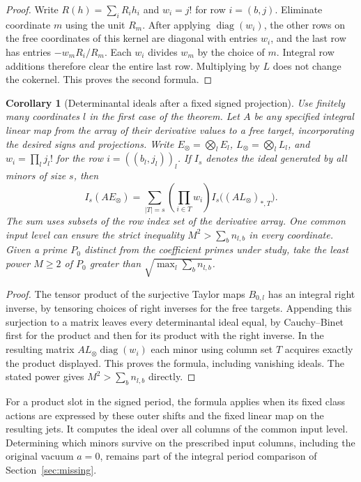 \documentclass[a4paper,11pt]{article}
\newtheorem{corollary}[proposition]{Corollary}
\theoremstyle{definition}
\theoremstyle{remark}
\numberwithin{equation}{section}
\begin{document}
\begin{proof}
Write \(R(h)=\sum_i R_i h_i\) and \(w_i=j!\) for row \(i=(b,j)\).
Eliminate coordinate \(m\) using the unit \(R_m\). After applying
\(\operatorname{diag}(w_i)\), the other rows on the free
coordinates of this kernel are diagonal with entries \(w_i\),
and the last row has entries \(-w_m R_i/R_m\). Each \(w_i\)
divides \(w_m\) by the choice of \(m\). Integral row additions
therefore clear the entire last row. Multiplying by \(L\) does
not change the cokernel. This proves the second formula.
\end{proof}

\begin{corollary}[Determinantal ideals after a fixed signed projection]\leavevmode
\label{cor:projectedminors485}
Use finitely many coordinates \(l\) in the first case of the
theorem. Let \(A\) be any specified integral linear map from the
array of their derivative values to a free target, incorporating
the desired signs and projections. Write \(E_\otimes=\bigotimes_lE_l\),
\(L_\otimes=\bigotimes_l L_l\), and
\(w_i=\prod_l j_l!\) for the row \(i=((b_l,j_l))_l\).
If \(I_s\) denotes the ideal generated by all minors of size \(s\),
then
\[
 I_s(AE_\otimes)
      =\sum_{|T|=s}
        \left(\prod_{i\in T}w_i\right)
                  I_s\bigl((A L_\otimes)_{*,T}\bigr).
\]
The sum uses subsets of the row index set of the derivative
array. One common input level can ensure the strict inequality
\(M^2>\sum_b n_{l,b}\) in every coordinate. Given a prime
\(P_0\) distinct from the coefficient primes under study, take
the least power \(M\ge2\) of \(P_0\) greater than
\(\sqrt{\max_l\sum_b n_{l,b}}\).
\end{corollary}
\begin{proof}
The tensor product of the surjective Taylor maps \(B_{0,l}\)
has an integral right inverse, by tensoring choices of right
inverses for the free targets. Appending this surjection to a
matrix leaves every determinantal ideal equal, by Cauchy--Binet
first for the product and then for its product with the right
inverse. In the resulting matrix \(AL_\otimes\operatorname{diag}(w_i)\)
each minor using column set \(T\) acquires exactly the product
displayed. This proves the formula, including vanishing ideals.
The stated power gives \(M^2>\sum_b n_{l,b}\) directly.
\end{proof}

For a product slot in the signed period, the formula applies when
its fixed class actions are expressed by these outer shifts and
the fixed linear map on the resulting jets. It computes the
ideal over all columns of the common input level. Determining
which minors survive on the prescribed input columns, including
the original vacuum \(a=0\), remains part of the integral period
comparison of Section~\ref{sec:missing}.
\end{document}
